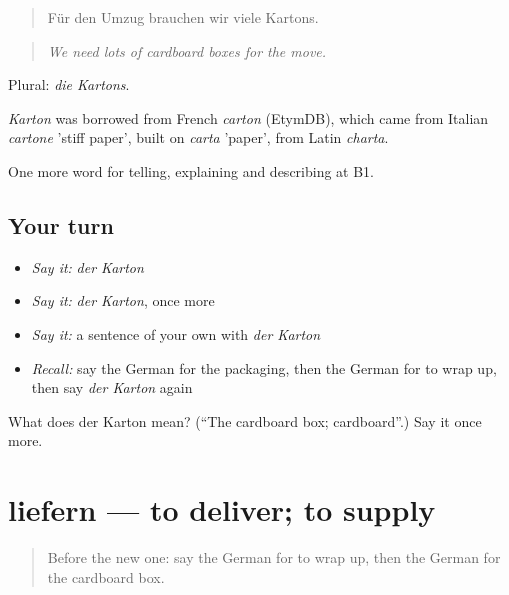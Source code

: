 \begin{quote}
Für den Umzug brauchen wir viele Kartons.
\end{quote}

\begin{quote}
\emph{We need lots of cardboard boxes for the move.}
\end{quote}

Plural: \emph{die Kartons}.

\begin{cousinweb}
\emph{Karton} was borrowed from French \emph{carton} (EtymDB), which came from Italian \emph{cartone} 'stiff paper', built on \emph{carta} 'paper', from Latin \emph{charta}.
\end{cousinweb}

\begin{grammarlens}[title={What you've built}]
One more word for telling, explaining and describing at B1.
\end{grammarlens}

\subsection*{Your turn}
\begin{itemize}
\raggedright
  \item \emph{Say it:} \emph{der Karton}
  \item \emph{Say it:} \emph{der Karton}, once more
  \item \emph{Say it:} a sentence of your own with \emph{der Karton}
  \item \emph{Recall:} say the German for the packaging, then the German for to wrap up, then say \emph{der Karton} again
\end{itemize}

\begin{tcolorbox}[breakable,colback=teal!4,colframe=teal!35!black,title={Before you move on}]
What does der Karton mean? (\textquotedblleft{}The cardboard box; cardboard\textquotedblright{}.) Say it once more.
\end{tcolorbox}
\section[liefern]{liefern — to deliver; to supply}

\label{lesson:GE-C452-liefern}



\begin{quote}
Before the new one: say the German for to wrap up, then the German for the cardboard box.
\end{quote}

